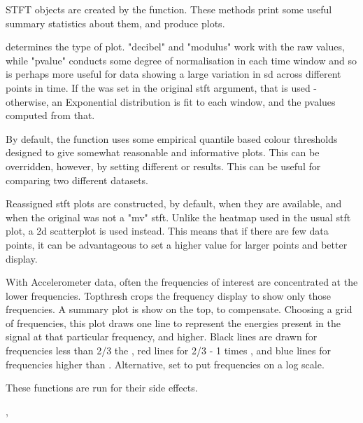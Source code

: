 \documentclass[a4paper]{book}
\begin{document}
\begin{Details}\relax
STFT objects are created by the  function. These methods print some useful summary statistics about them, and produce plots.

 determines the type of plot. "decibel" and "modulus" work with the raw values, while "pvalue" conducts some degree of normalisation in each time window and so is perhaps more useful for data showing a large variation in sd across different points in time. If the  was set in the original stft argument, that is used - otherwise, an Exponential distribution is fit to each window, and the pvalues computed from that.

By default, the function uses some empirical quantile based colour thresholds designed to give somewhat reasonable and informative plots. This can be overridden, however, by setting different  or  results. This can be useful for comparing two different datasets.

Reassigned stft plots are constructed, by default, when they are available, and when the original was not a "mv" stft. Unlike the heatmap used in the usual stft plot, a 2d scatterplot is used instead. This means that if there are few data points, it can be advantageous to set a higher  value for larger points and better display.

With Accelerometer data, often the frequencies of interest are concentrated at the lower frequencies. Topthresh crops the frequency display to show only those frequencies. A summary plot is show on the top, to compensate. Choosing a grid of frequencies, this plot draws one line to represent the energies present in the signal at that particular frequency, and higher. Black lines are drawn for frequencies less than 2/3 the , red lines for 2/3 - 1 times , and blue lines for frequencies higher than . Alternative, set  to put frequencies on a log scale.
\end{Details}
%
\begin{Value}
These functions are run for their side effects.
\end{Value}
%
\begin{SeeAlso}\relax
{}, 
\end{SeeAlso}
%
\end{document}
